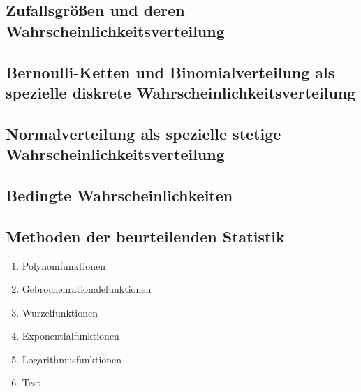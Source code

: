 \documentclass{article}
\begin{document}
\subsection{Zufallsgrößen und deren Wahrscheinlichkeitsverteilung}
\subsection{Bernoulli-Ketten und Binomialverteilung als spezielle diskrete Wahrscheinlichkeitsverteilung}
\subsection{Normalverteilung als spezielle stetige Wahrscheinlichkeitsverteilung}
\subsection{Bedingte Wahrscheinlichkeiten}
\subsection{Methoden der beurteilenden Statistik}


\begin{enumerate}
    \item Polynomfunktionen
    \item Gebrochenrationalefunktionen
    \item Wurzelfunktionen
    \item Exponentialfunktionen
    \item Logarithmusfunktionen
    \item Test
\end{enumerate}
\end{document}
